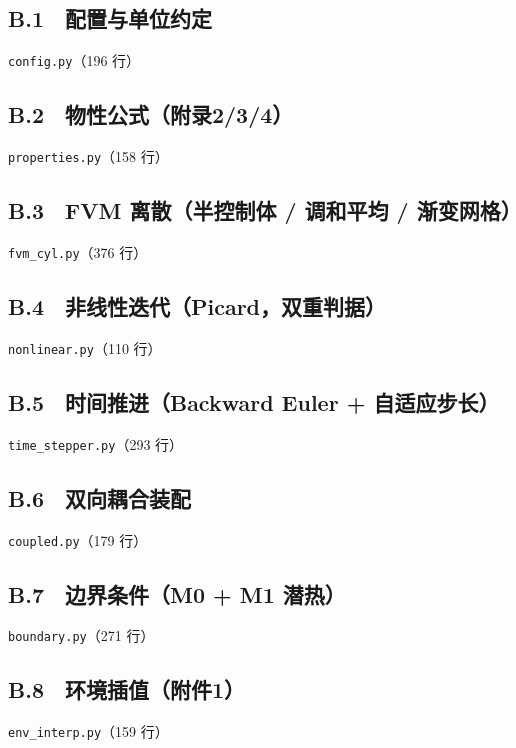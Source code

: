 \subsection*{B.1　配置与单位约定}
\noindent\texttt{config.py}（196 行）


\subsection*{B.2　物性公式（附录2/3/4）}
\noindent\texttt{properties.py}（158 行）


\subsection*{B.3　FVM 离散（半控制体 / 调和平均 / 渐变网格）}
\noindent\texttt{fvm\_cyl.py}（376 行）


\subsection*{B.4　非线性迭代（Picard，双重判据）}
\noindent\texttt{nonlinear.py}（110 行）


\subsection*{B.5　时间推进（Backward Euler + 自适应步长）}
\noindent\texttt{time\_stepper.py}（293 行）


\subsection*{B.6　双向耦合装配}
\noindent\texttt{coupled.py}（179 行）


\subsection*{B.7　边界条件（M0 + M1 潜热）}
\noindent\texttt{boundary.py}（271 行）


\subsection*{B.8　环境插值（附件1）}
\noindent\texttt{env\_interp.py}（159 行）


